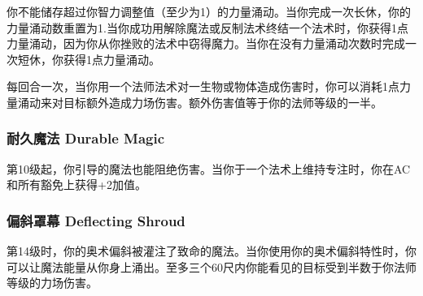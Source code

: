 你不能储存超过你智力调整值（至少为1）的力量涌动。当你完成一次长休，你的力量涌动数重置为1.当你成功用解除魔法或反制法术终结一个法术时，你获得1点力量涌动，因为你从你挫败的法术中窃得魔力。当你在没有力量涌动次数时完成一次短休，你获得1点力量涌动。

每回合一次，当你用一个法师法术对一生物或物体造成伤害时，你可以消耗1点力量涌动来对目标额外造成力场伤害。额外伤害值等于你的法师等级的一半。

\subsubsection{耐久魔法 Durable Magic}第10级起，你引导的魔法也能阻绝伤害。当你于一个法术上维持专注时，你在AC和所有豁免上获得+2加值。

\subsubsection{偏斜罩幕 Deflecting Shroud}第14级时，你的奥术偏斜被灌注了致命的魔法。当你使用你的奥术偏斜特性时，你可以让魔法能量从你身上涌出。至多三个60尺内你能看见的目标受到半数于你法师等级的力场伤害。